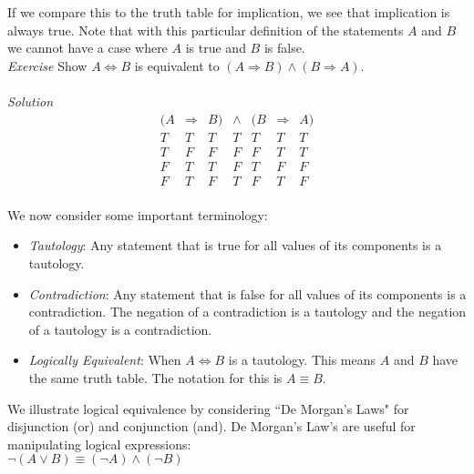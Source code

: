 If we compare this to the truth table for implication, we see that implication is always true.  Note that with this particular definition of the statements $A$ and $B$ we cannot have a case where $A$ is true and $B$ is false. \\ 

\textit{Exercise}
Show $A  \Longleftrightarrow  B$ is equivalent to $\left(A \Longrightarrow B \right) \land \left(B \Longrightarrow A \right).$ 
\\
\\
\textit{Solution} \\
\begin{displaymath}
\begin{array}{|c|c|c|c|c|c|c|}
(A & \Longrightarrow & B)  & \land & (B & \Longrightarrow & A ) \\
\hline
T & T & T & T & T & T & T  \\
T & F & F & F & F & T & T  \\
F & T & T & F & T & F & F  \\
F & T & F & T & F & T & F  \\
\end{array}
\end{displaymath}

We now consider some important terminology:

\begin{itemize}
\item \textit{Tautology}:  Any statement that is true for all values of its components is a tautology.

\item \textit{Contradiction}:  Any statement that is false for all values of its components is a contradiction.  The negation of a contradiction is a tautology and the negation of a tautology is a contradiction.

\item \textit{Logically Equivalent}:  When $ A \Longleftrightarrow B $ is a tautology.  This means $A$ and $B$ have the same truth table.  The notation for this is $A \equiv B$.

\end{itemize}

We illustrate logical equivalence by considering ``De Morgan's Laws"  for disjunction (or) and conjunction (and).  De Morgan's Law's are useful for manipulating logical expressions: \\

$\neg\left(A \lor B \right) \equiv \left(\neg A\right) \land \left(\neg B \right)$

